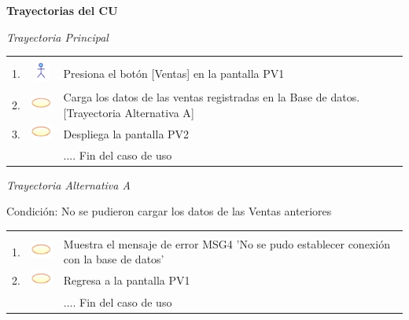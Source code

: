 \documentclass[10pt,spanish]{article}
\providecommand{\tabularnewline}{\\}
\begin{document}


\textbf{\large Trayectorias del CU}{\large \par}

\textit{\large Trayectoria Principal}{\large {} }{\large \par}


\begin{tabular}{ccl}
 &  & \tabularnewline
1.  & \includegraphics{actor}  & \multicolumn{1}{p{12cm}}{ Presiona el botón {[}Ventas{]} en la pantalla PV1}\tabularnewline
2.  & \includegraphics{sistema}  & \multicolumn{1}{p{12cm}}{Carga los datos de las ventas registradas en la Base de datos. 		
{[}Trayectoria Alternativa A{]}}\tabularnewline
3.  & \includegraphics{sistema}  & \multicolumn{1}{p{12cm}}{Despliega la pantalla PV2}\tabularnewline
 &  & \multicolumn{1}{p{12cm}}{.... Fin del caso de uso}\tabularnewline
\end{tabular}

\textit{Trayectoria Alternativa A}

Condición: No se pudieron cargar los datos de las Ventas anteriores

\begin{tabular}{ccl}
 &  & \tabularnewline
1.  & \includegraphics{sistema}  & \multicolumn{1}{p{12cm}}{ Muestra el mensaje de error MSG4 'No se pudo establecer conexión
con la base de datos'}\tabularnewline
2.  & \includegraphics{sistema}  & \multicolumn{1}{p{12cm}}{Regresa a la pantalla PV1}\tabularnewline
 &  & \multicolumn{1}{p{12cm}}{.... Fin del caso de uso}\tabularnewline
\end{tabular}
\end{document}
